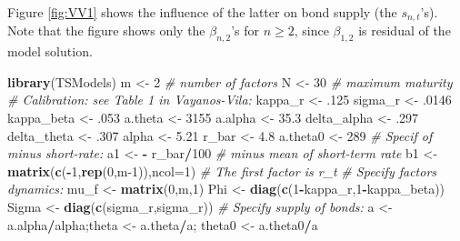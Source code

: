 \documentclass[
  12pt,
]{book}
\newenvironment{Shaded}{\begin{snugshade}}{\end{snugshade}}
\newcommand{\AttributeTok}[1]{\textcolor[rgb]{0.13,0.29,0.53}{#1}}
\newcommand{\CommentTok}[1]{\textcolor[rgb]{0.56,0.35,0.01}{\textit{#1}}}
\newcommand{\DecValTok}[1]{\textcolor[rgb]{0.00,0.00,0.81}{#1}}
\newcommand{\FloatTok}[1]{\textcolor[rgb]{0.00,0.00,0.81}{#1}}
\newcommand{\FunctionTok}[1]{\textcolor[rgb]{0.13,0.29,0.53}{\textbf{#1}}}
\newcommand{\NormalTok}[1]{#1}
\newcommand{\OtherTok}[1]{\textcolor[rgb]{0.56,0.35,0.01}{#1}}
\newcommand{\SpecialCharTok}[1]{\textcolor[rgb]{0.81,0.36,0.00}{\textbf{#1}}}
\theoremstyle{definition}
\theoremstyle{definition}
\theoremstyle{definition}
\theoremstyle{definition}
\theoremstyle{remark}
\begin{document}
Figure \ref{fig:VV1} shows the influence of the latter on bond supply (the \(s_{n,t}\)'s). Note that the figure shows only the \(\beta_{n,2}\)'s for \(n \ge 2\), since \(\beta_{1,2}\) is residual of the model solution.

\begin{Shaded}
\begin{Highlighting}[]
\FunctionTok{library}\NormalTok{(TSModels)}
\NormalTok{m }\OtherTok{\textless{}{-}} \DecValTok{2} \CommentTok{\# number of factors}
\NormalTok{N }\OtherTok{\textless{}{-}} \DecValTok{30} \CommentTok{\# maximum maturity}
\CommentTok{\# Calibration: see Table 1 in Vayanos{-}Vila:}
\NormalTok{kappa\_r     }\OtherTok{\textless{}{-}}\NormalTok{ .}\DecValTok{125}
\NormalTok{sigma\_r     }\OtherTok{\textless{}{-}}\NormalTok{ .}\DecValTok{0146}
\NormalTok{kappa\_beta  }\OtherTok{\textless{}{-}}\NormalTok{ .}\DecValTok{053}
\NormalTok{a.theta     }\OtherTok{\textless{}{-}} \DecValTok{3155}
\NormalTok{a.alpha     }\OtherTok{\textless{}{-}} \FloatTok{35.3}
\NormalTok{delta\_alpha }\OtherTok{\textless{}{-}}\NormalTok{ .}\DecValTok{297}
\NormalTok{delta\_theta }\OtherTok{\textless{}{-}}\NormalTok{ .}\DecValTok{307}
\NormalTok{alpha       }\OtherTok{\textless{}{-}} \FloatTok{5.21}
\NormalTok{r\_bar       }\OtherTok{\textless{}{-}} \FloatTok{4.8}
\NormalTok{a.theta0    }\OtherTok{\textless{}{-}} \DecValTok{289}
\CommentTok{\# Specif of minus short{-}rate:}
\NormalTok{a1 }\OtherTok{\textless{}{-}} \SpecialCharTok{{-}}\NormalTok{ r\_bar}\SpecialCharTok{/}\DecValTok{100} \CommentTok{\# minus mean of short{-}term rate}
\NormalTok{b1 }\OtherTok{\textless{}{-}} \FunctionTok{matrix}\NormalTok{(}\FunctionTok{c}\NormalTok{(}\SpecialCharTok{{-}}\DecValTok{1}\NormalTok{,}\FunctionTok{rep}\NormalTok{(}\DecValTok{0}\NormalTok{,m}\DecValTok{{-}1}\NormalTok{)),}\AttributeTok{ncol=}\DecValTok{1}\NormalTok{) }\CommentTok{\# The first factor is r\_t}
\CommentTok{\# Specify factors\textquotesingle{} dynamics:}
\NormalTok{mu\_f  }\OtherTok{\textless{}{-}} \FunctionTok{matrix}\NormalTok{(}\DecValTok{0}\NormalTok{,m,}\DecValTok{1}\NormalTok{)}
\NormalTok{Phi   }\OtherTok{\textless{}{-}} \FunctionTok{diag}\NormalTok{(}\FunctionTok{c}\NormalTok{(}\DecValTok{1}\SpecialCharTok{{-}}\NormalTok{kappa\_r,}\DecValTok{1}\SpecialCharTok{{-}}\NormalTok{kappa\_beta))}
\NormalTok{Sigma }\OtherTok{\textless{}{-}} \FunctionTok{diag}\NormalTok{(}\FunctionTok{c}\NormalTok{(sigma\_r,sigma\_r))}
\CommentTok{\# Specify supply of bonds:}
\NormalTok{a }\OtherTok{\textless{}{-}}\NormalTok{ a.alpha}\SpecialCharTok{/}\NormalTok{alpha;theta }\OtherTok{\textless{}{-}}\NormalTok{ a.theta}\SpecialCharTok{/}\NormalTok{a; theta0 }\OtherTok{\textless{}{-}}\NormalTok{ a.theta0}\SpecialCharTok{/}\NormalTok{a}

\end{Highlighting}
\end{Shaded}
\end{document}
